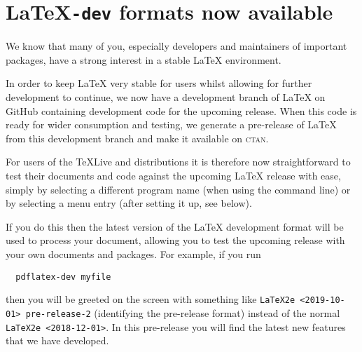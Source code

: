 \documentclass{ltnews}
\providecommand\MiKTeX{\hologo{MiKTeX}}
\providecommand\CTAN{\textsc{ctan}}
\providecommand\TL{\TeX{}Live}
\begin{document}

\maketitle
\tableofcontents

\setlength{}


\medskip





\section{\LaTeX\texttt{-dev} formats now available}


We know that many of you, especially developers and maintainers of
important packages, have a strong interest in a stable \LaTeX{}
environment.

In order to keep \LaTeX{} very stable for users whilst allowing for
further development to continue, we now have a development branch of
\LaTeX{} on GitHub containing development code for the upcoming
release. When this code is ready for wider consumption and testing, we
generate a pre-release of \LaTeX{} from this development branch and make
it available on \CTAN.

For users of the \TL{} and \MiKTeX{} distributions it is therefore now
straightforward to test their documents and code against the upcoming
\LaTeX{} release with ease, simply by selecting a different program name
(when using the command line) or by selecting a menu entry (after
setting it up, see below).

If you do this then the latest version of the \LaTeX{} development format
will be used to process your document, allowing you to test the
upcoming release with your own documents and packages. For example, if
you run
\begin{verbatim}
  pdflatex-dev myfile
\end{verbatim}
then you will be greeted on the screen with something like \texttt{LaTeX2e
  <2019-10-01> pre-release-2} (identifying the pre-release format)
instead of the normal \texttt{LaTeX2e <2018-12-01>}. In this
pre-release you will find the latest new features that we have
developed. 
\end{document}
